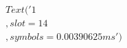\documentclass[preview]{standalone}
\begin{document}
\begin{align*}
Text('1\\,slot = 14\\, symbols = 0.00390625 ms')
\end{align*}
\end{document}
